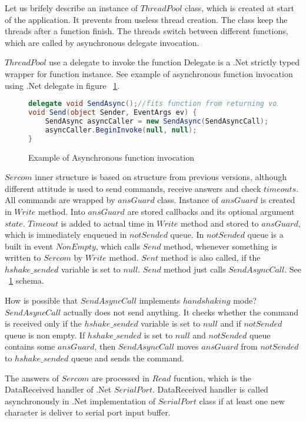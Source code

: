 	Let us brifely describe an instance of $ThreadPool$ class, which is created at 
	start of the application. It prevents from useless thread creation. The class keep the threads after 
	a function finish. The threads switch between different functions, which are called 
	by asynchronous delegate invocation.
	
	$ThreadPool$ use a delegate to invoke the function
	Delegate is a .Net strictly typed wrapper for function instance. \cite{delegate}
	See example of asynchronous function invocation using .Net delegate in figure ~\ref{deleg}.
	
\begin{figure}[!hbp]
\begin{lstlisting}[language=cs]
delegate void SendAsync();//fits function from returning void and which has no args	
void Send(object Sender, EventArgs ev) {
	SendAsync asyncCaller = new SendAsync(SendAsyncCall);
	asyncCaller.BeginInvoke(null, null);      
}
\end{lstlisting}
\caption{Example of Asynchronous function invocation}\label{deleg}
\end{figure}


	$Sercom$ inner structure is based on structure from previous versions, although
	different attitude is used to send commands, receive answers and check $timeouts$.
	All commands are wrapped by $ansGuard$ class. Instance of $ansGuard$ is created in $Write$ method.
	Into $ansGuard$ are stored callbacks and its optional argument $state$.  $Timeout$ is added to actual time
	in $Write$ method and stored to $ansGuard$, which is immediately enqueued in $notSended$ queue.
	In $notSended$ queue is a built in event $NonEmpty$, which calls $Send$ method, whenever something is written
	to $Sercom$ by $Write$ method. $Sent$ method is also called, if the $hshake\_sended$ variable is set to $null$.
	$Send$ method just calls $SendAsyncCall$. See ~\ref{deleg} schema.

	How is possible that $SendAsyncCall$ implements $handshaking$ mode?
	$SendAsyncCall$ actually does not send anything. It checks whether the command is received only if the $hshake\_sended$
	variable is set to $null$ and if $notSended$ queue is non empty. If $hshake\_sended$ is set to $null$ and $notSended$ queue
	contains some $ansGuard$, then $SendAsyncCall$ moves $ansGuard$ from $notSended$ to $hshake\_sended$
	queue and sends the command. 
	
	
	The answers of $Sercom$ are processed in $Read$ fucntion,
	which is the DataReceived handler of .Net $SerialPort$. DataReceived handler is called asynchronously
	in .Net implementation of $SerialPort$ class if at least one new character is deliver to
	serial port input buffer. 

